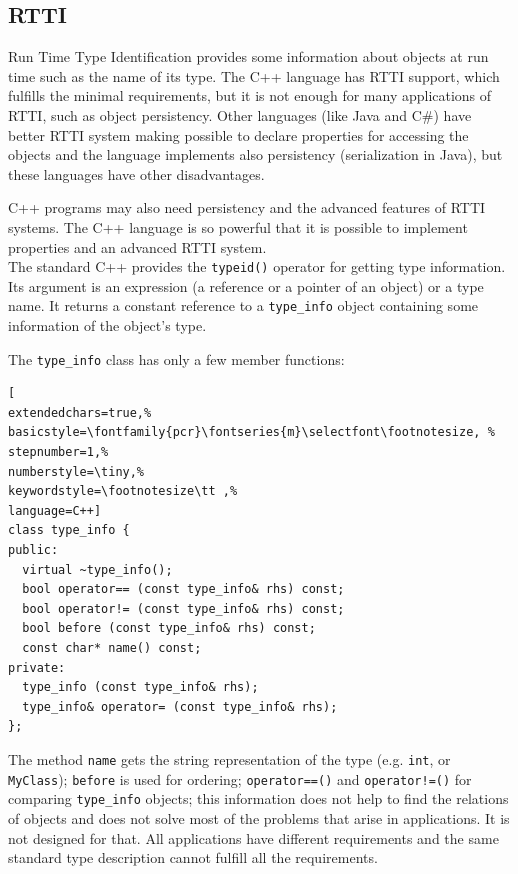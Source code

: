 \subsection{RTTI}

Run Time Type Identification provides some information about objects at run time such as the name of its type. The C++ language has RTTI support, which fulfills the minimal requirements, but it is not enough for many applications of RTTI, such as object persistency. Other languages (like Java and C\#) have better RTTI system making possible to declare properties for accessing the objects and the language implements also persistency (serialization in Java), but these languages have other disadvantages.

C++ programs may also need persistency and the advanced features of RTTI systems. The C++ language is so powerful that it is possible to implement properties and an advanced RTTI system.\\


The standard C++ provides the \texttt{typeid()} operator for getting type information. Its argument is an expression (a reference or a pointer of an object) or a type name. It returns a constant reference to a \texttt{type\_info} object containing some information of the object's type.

The \texttt{type\_info} class has only a few member functions:
\begin{lstlisting}[
extendedchars=true,%
basicstyle=\fontfamily{pcr}\fontseries{m}\selectfont\footnotesize, %
stepnumber=1,%
numberstyle=\tiny,%
keywordstyle=\footnotesize\tt ,%
language=C++]
class type_info {
public:
  virtual ~type_info();
  bool operator== (const type_info& rhs) const;
  bool operator!= (const type_info& rhs) const;
  bool before (const type_info& rhs) const;
  const char* name() const;
private:
  type_info (const type_info& rhs);
  type_info& operator= (const type_info& rhs);
};
\end{lstlisting}

The method \texttt{name} gets the string representation of the type (e.g. \texttt{int}, or \texttt{MyClass}); \texttt{before} is used for ordering; \texttt{operator==()} and \texttt{operator!=()} for comparing \texttt{type\_info} objects; this information does not help to find the relations of objects and does not solve most of the problems that arise in applications. It is not designed for that. All applications have different requirements and the same standard type description cannot fulfill all the requirements. \\


